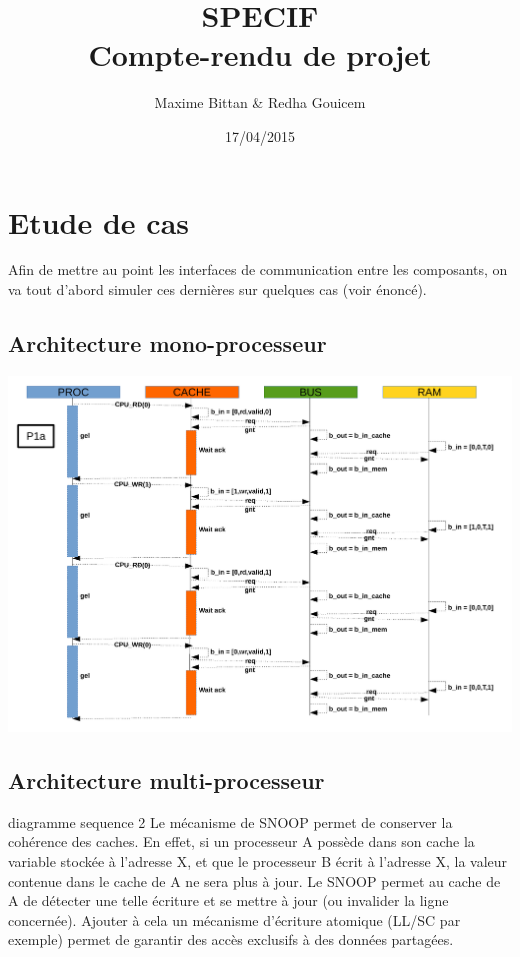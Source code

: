 \documentclass[a4paper, 11pt]{article}
\begin{document}
 
\title{SPECIF\\Compte-rendu de projet}
\author{Maxime Bittan \& Redha Gouicem}
\date{17/04/2015}
 
\maketitle

\section{Etude de cas}
Afin de mettre au point les interfaces de communication entre les
composants, on va tout d'abord simuler ces dernières sur quelques cas
(voir énoncé).
\subsection{Architecture mono-processeur}
\begin{center}
\centerline{\includegraphics[scale=0.5]{images/seq1.pdf}}
\end{center}

\subsection{Architecture multi-processeur}
diagramme sequence 2
Le mécanisme de SNOOP permet de conserver la cohérence des caches. En effet,
si un processeur A possède dans son cache la variable stockée à l'adresse X,
et que le processeur B écrit à l'adresse X, la valeur contenue dans le cache
de A ne sera plus à jour. Le SNOOP permet au cache de A de détecter une telle
écriture et se mettre à jour (ou invalider la ligne concernée). Ajouter à
cela un mécanisme d'écriture atomique (LL/SC par exemple) permet de garantir
des accès exclusifs à des données partagées.
\end{document}
